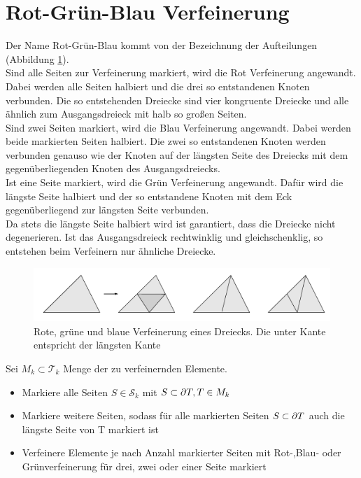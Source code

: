 \section{Rot-Grün-Blau Verfeinerung}
Der Name Rot-Grün-Blau kommt von der Bezeichnung der Aufteilungen (Abbildung \ref{dreieck}). \\ Sind alle Seiten zur Verfeinerung markiert, wird die Rot Verfeinerung angewandt. Dabei werden alle Seiten halbiert und die drei so entstandenen Knoten verbunden. Die so entstehenden Dreiecke sind vier kongruente Dreiecke und alle ähnlich zum Ausgangsdreieck mit halb so großen Seiten. \\ Sind zwei Seiten markiert, wird die Blau Verfeinerung angewandt. Dabei werden beide markierten Seiten halbiert. Die zwei so entstandenen Knoten werden verbunden genauso wie der Knoten auf der längsten Seite des Dreiecks mit dem gegenüberliegenden Knoten des Ausgangsdreiecks. \\
Ist eine Seite markiert, wird die Grün Verfeinerung angewandt. Dafür wird die längste Seite halbiert und der so entstandene Knoten mit dem Eck gegenüberliegend zur längsten Seite verbunden. \\
Da stets die längste Seite halbiert wird ist garantiert, dass die Dreiecke nicht degenerieren. Ist das Ausgangsdreieck rechtwinklig und gleichschenklig, so entstehen beim Verfeinern nur ähnliche Dreiecke.
\begin{figure}[!htbp]
	\begin{center}
		\includegraphics[width=16cm]{pics/redref.png}
	\end{center}
	\caption{\label{dreieck}Rote, grüne und blaue Verfeinerung eines Dreiecks. Die unter Kante entspricht der längsten Kante}
\end{figure}

\begin{algorithmus}
    Sei $M_k\subset \mathscr{T}_k$ Menge der zu verfeinernden Elemente.
	\begin{itemize}
		\item[(1)] Markiere alle Seiten $S \in \mathscr{S}_k$ mit $S \subset \partial T, T\in M_k$
		\item[(2)] Markiere weitere Seiten, sodass für alle markierten Seiten $S\subset \partial T$  auch die längste Seite von T markiert ist
		\item[(3)] Verfeinere Elemente je nach Anzahl markierter Seiten mit  Rot-,Blau- oder Grünverfeinerung für drei, zwei oder einer Seite markiert
	\end{itemize}
\end{algorithmus}

